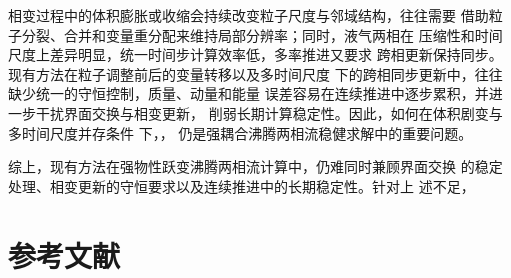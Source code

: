 相变过程中的体积膨胀或收缩会持续改变粒子尺度与邻域结构，往往需要
借助粒子分裂、合并和变量重分配来维持局部分辨率；同时，液气两相在
压缩性和时间尺度上差异明显，统一时间步计算效率低，多率推进又要求
跨相更新保持同步。现有方法在粒子调整前后的变量转移以及多时间尺度
下的跨相同步更新中，往往缺少统一的守恒控制，质量、动量和能量
误差容易在连续推进中逐步累积，并进一步干扰界面交换与相变更新，
削弱长期计算稳定性。因此，如何在体积剧变与多时间尺度并存条件
下，，
仍是强耦合沸腾两相流稳健求解中的重要问题。

综上，现有方法在强物性跃变沸腾两相流计算中，仍难同时兼顾界面交换
的稳定处理、相变更新的守恒要求以及连续推进中的长期稳定性。针对上
述不足，

\newpage
\section{参考文献}
\begin{REF}
\vspace{-52pt}

\end{REF}

\newpage
